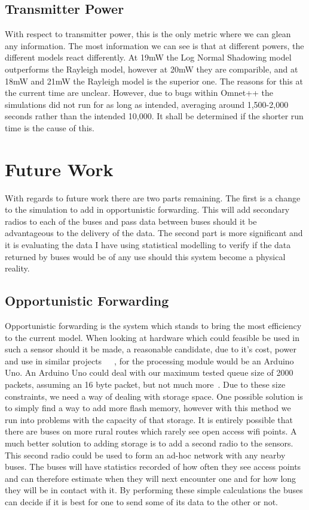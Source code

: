 \documentclass[12pt,a4paper,notitlepage]{article}
\begin{document}
\subsection{Transmitter Power}
 
With respect to transmitter power, this is the only metric where we can glean any information. The most information we can see is that at different powers, the different models react differently. At 19mW the Log Normal Shadowing model outperforms the Rayleigh model, however at 20mW they are comparible, and at 18mW and 21mW the Rayleigh model is the superior one. The reasons for this at the current time are unclear. However, due to bugs within Omnet++ the simulations did not run for as long as intended, averaging around 1,500-2,000 seconds rather than the intended 10,000. It shall be determined if the shorter run time is the cause of this. 

\section{Future Work}

With regards to future work there are two parts remaining. The first is a change to the simulation to add in opportunistic forwarding. This will add secondary radios to each of the buses and pass data between buses should it be advantageous to the delivery of the data. The second part is more significant and it is evaluating the data I have using statistical modelling to verify if the data returned by buses would be of any use should this system become a physical reality. 

\subsection{Opportunistic Forwarding}

Opportunistic forwarding is the system which stands to bring the most efficiency to the current model. When looking at hardware which could feasible be used in such a sensor should it be made, a reasonable candidate, due to it's cost, power and use in similar projects~\cite{arduinoproj1}~\cite{arduinoproj2}~\cite{arduinoproj3}, for the processing module would be an Arduino Uno. An Arduino Uno could deal with our maximum tested queue size of 2000 packets, assuming an 16 byte packet, but not much more~\cite{arduinounospecs}. Due to these size constraints, we need a way of dealing with storage space. One possible solution is to simply find a way to add more flash memory, however with this method we run into problems with the capacity of that storage. It is entirely possible that there are buses on more rural routes which rarely see open access wifi points. A much better solution to adding storage is to add a second radio to the sensors. This second radio could be used to form an ad-hoc network with any nearby buses. The buses will have statistics recorded of how often they see access points and can therefore estimate when they will next encounter one and for how long they will be in contact with it. By performing these simple calculations the buses can decide if it is best for one to send some of its data to the other or not. 
\end{document}
